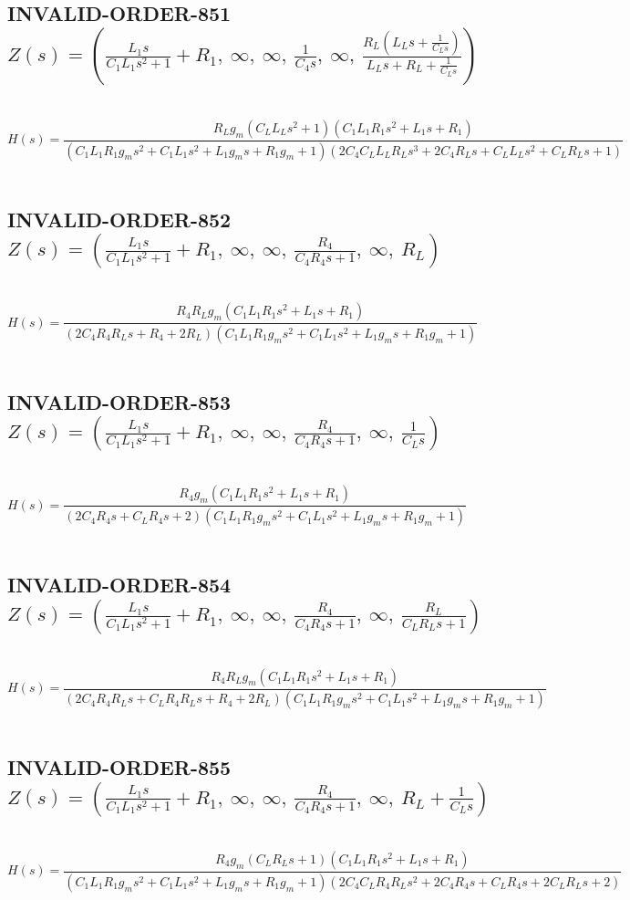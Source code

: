 \documentclass{article}
\begin{document}
\subsection{INVALID-ORDER-851 $Z(s) = \left( \frac{L_{1} s}{C_{1} L_{1} s^{2} + 1} + R_{1}, \  \infty, \  \infty, \  \frac{1}{C_{4} s}, \  \infty, \  \frac{R_{L} \left(L_{L} s + \frac{1}{C_{L} s}\right)}{L_{L} s + R_{L} + \frac{1}{C_{L} s}}\right)$ } \ 
\textbf{\[H(s) = \frac{R_{L} g_{m} \left(C_{L} L_{L} s^{2} + 1\right) \left(C_{1} L_{1} R_{1} s^{2} + L_{1} s + R_{1}\right)}{\left(C_{1} L_{1} R_{1} g_{m} s^{2} + C_{1} L_{1} s^{2} + L_{1} g_{m} s + R_{1} g_{m} + 1\right) \left(2 C_{4} C_{L} L_{L} R_{L} s^{3} + 2 C_{4} R_{L} s + C_{L} L_{L} s^{2} + C_{L} R_{L} s + 1\right)}\] } \ 
\subsection{INVALID-ORDER-852 $Z(s) = \left( \frac{L_{1} s}{C_{1} L_{1} s^{2} + 1} + R_{1}, \  \infty, \  \infty, \  \frac{R_{4}}{C_{4} R_{4} s + 1}, \  \infty, \  R_{L}\right)$ } \ 
\textbf{\[H(s) = \frac{R_{4} R_{L} g_{m} \left(C_{1} L_{1} R_{1} s^{2} + L_{1} s + R_{1}\right)}{\left(2 C_{4} R_{4} R_{L} s + R_{4} + 2 R_{L}\right) \left(C_{1} L_{1} R_{1} g_{m} s^{2} + C_{1} L_{1} s^{2} + L_{1} g_{m} s + R_{1} g_{m} + 1\right)}\] } \ 
\subsection{INVALID-ORDER-853 $Z(s) = \left( \frac{L_{1} s}{C_{1} L_{1} s^{2} + 1} + R_{1}, \  \infty, \  \infty, \  \frac{R_{4}}{C_{4} R_{4} s + 1}, \  \infty, \  \frac{1}{C_{L} s}\right)$ } \ 
\textbf{\[H(s) = \frac{R_{4} g_{m} \left(C_{1} L_{1} R_{1} s^{2} + L_{1} s + R_{1}\right)}{\left(2 C_{4} R_{4} s + C_{L} R_{4} s + 2\right) \left(C_{1} L_{1} R_{1} g_{m} s^{2} + C_{1} L_{1} s^{2} + L_{1} g_{m} s + R_{1} g_{m} + 1\right)}\] } \ 
\subsection{INVALID-ORDER-854 $Z(s) = \left( \frac{L_{1} s}{C_{1} L_{1} s^{2} + 1} + R_{1}, \  \infty, \  \infty, \  \frac{R_{4}}{C_{4} R_{4} s + 1}, \  \infty, \  \frac{R_{L}}{C_{L} R_{L} s + 1}\right)$ } \ 
\textbf{\[H(s) = \frac{R_{4} R_{L} g_{m} \left(C_{1} L_{1} R_{1} s^{2} + L_{1} s + R_{1}\right)}{\left(2 C_{4} R_{4} R_{L} s + C_{L} R_{4} R_{L} s + R_{4} + 2 R_{L}\right) \left(C_{1} L_{1} R_{1} g_{m} s^{2} + C_{1} L_{1} s^{2} + L_{1} g_{m} s + R_{1} g_{m} + 1\right)}\] } \ 
\subsection{INVALID-ORDER-855 $Z(s) = \left( \frac{L_{1} s}{C_{1} L_{1} s^{2} + 1} + R_{1}, \  \infty, \  \infty, \  \frac{R_{4}}{C_{4} R_{4} s + 1}, \  \infty, \  R_{L} + \frac{1}{C_{L} s}\right)$ } \ 
\textbf{\[H(s) = \frac{R_{4} g_{m} \left(C_{L} R_{L} s + 1\right) \left(C_{1} L_{1} R_{1} s^{2} + L_{1} s + R_{1}\right)}{\left(C_{1} L_{1} R_{1} g_{m} s^{2} + C_{1} L_{1} s^{2} + L_{1} g_{m} s + R_{1} g_{m} + 1\right) \left(2 C_{4} C_{L} R_{4} R_{L} s^{2} + 2 C_{4} R_{4} s + C_{L} R_{4} s + 2 C_{L} R_{L} s + 2\right)}\] } \ 
\end{document}

